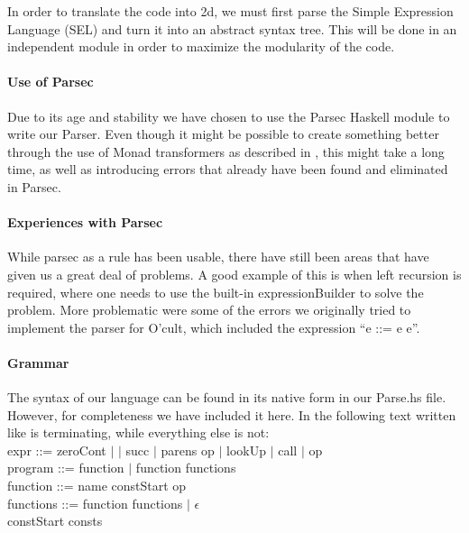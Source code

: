 \label{parser}
In order to translate the code into 2d, we must first parse the Simple
Expression Language (SEL) and turn it into an abstract syntax
tree. This will be done in an independent module in order to maximize
the modularity of the code.

\paragraph{Use of Parsec}
Due to its age and stability we have chosen to use the Parsec Haskell
module to write our Parser. Even though it might be possible to create
something better through the use of Monad transformers as described in
\cite{partial+parsing}, this might take a long time, as well as
introducing errors that already have been found and eliminated in
Parsec.

\paragraph{Experiences with Parsec}
While parsec as a rule has been usable, there have still been areas that have given us a great deal of problems. A
good example of this is when left recursion is required, where one
needs to use the built-in expressionBuilder to solve the problem. More
problematic were some of the errors we originally tried to implement
the parser for O'cult, which included the expression ``e ::= e e''.\\

\paragraph{Grammar}
The syntax of our language can be found in its native form in our
Parse.hs file. However, for completeness we have included it here. In
the following text written like  is terminating, while
everything else is not:\\

expr ::= zeroCont $\mid$  $\mid$ succ $\mid$ parens op $\mid$ lookUp $\mid$ call $\mid$ op\\

program ::= function $\mid$ function functions\\

function ::= name \bnf{=>} constStart op\\

functions ::= \bnf{,} function functions $\mid$ $\epsilon$\\

constStart \bnf{[} consts \bnf{]}\\

